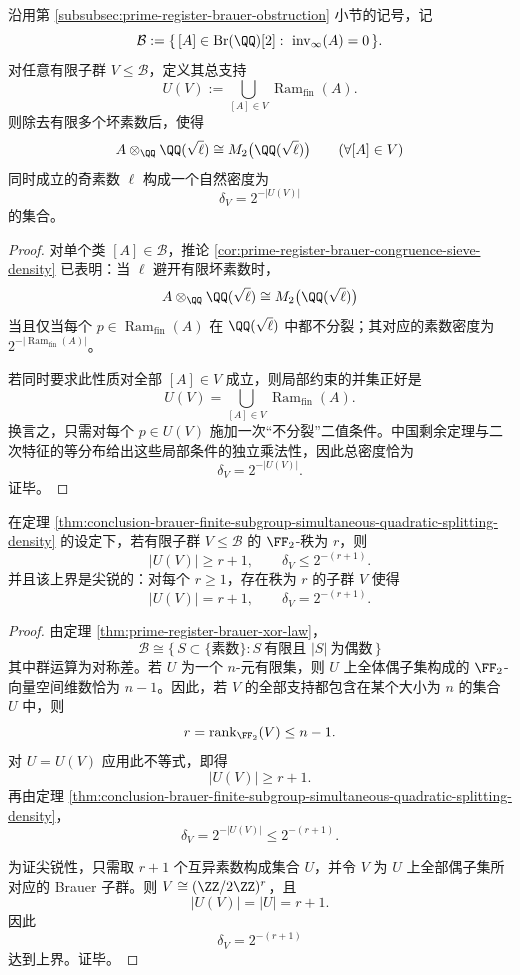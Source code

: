 \begin{theorem}\label{thm:conclusion-brauer-finite-subgroup-simultaneous-quadratic-splitting-density}
沿用第 \ref{subsubsec:prime-register-brauer-obstruction} 小节的记号，记
\[
\mathcal B:=\{\, [A]\in \mathrm{Br}(\QQ)[2]:\ \operatorname{inv}_\infty(A)=0\,\}.
\]
对任意有限子群 \(V\le \mathcal B\)，定义其总支持
\[
U(V):=\bigcup_{[A]\in V}\operatorname{Ram}_{\mathrm{fin}}(A).
\]
则除去有限多个坏素数后，使得
\[
A\otimes_{\QQ}\QQ(\sqrt{\ell})\cong M_2\bigl(\QQ(\sqrt{\ell})\bigr)
\qquad(\forall [A]\in V)
\]
同时成立的奇素数 \(\ell\) 构成一个自然密度为
\[
\delta_V=2^{-|U(V)|}
\]
的集合。
\end{theorem}
\begin{proof}
对单个类 \([A]\in\mathcal B\)，推论 \ref{cor:prime-register-brauer-congruence-sieve-density} 已表明：当 \(\ell\) 避开有限坏素数时，
\[
A\otimes_{\QQ}\QQ(\sqrt{\ell})\cong M_2\bigl(\QQ(\sqrt{\ell})\bigr)
\]
当且仅当每个 \(p\in \operatorname{Ram}_{\mathrm{fin}}(A)\) 在 \(\QQ(\sqrt{\ell})\) 中都不分裂；其对应的素数密度为 \(2^{-|\operatorname{Ram}_{\mathrm{fin}}(A)|}\)。

若同时要求此性质对全部 \([A]\in V\) 成立，则局部约束的并集正好是
\[
U(V)=\bigcup_{[A]\in V}\operatorname{Ram}_{\mathrm{fin}}(A).
\]
换言之，只需对每个 \(p\in U(V)\) 施加一次“不分裂”二值条件。中国剩余定理与二次特征的等分布给出这些局部条件的独立乘法性，因此总密度恰为
\[
\delta_V=2^{-|U(V)|}.
\]
证毕。
\end{proof}

\begin{theorem}\label{thm:conclusion-brauer-rank-support-sharp-density-bound}
在定理 \ref{thm:conclusion-brauer-finite-subgroup-simultaneous-quadratic-splitting-density} 的设定下，若有限子群 \(V\le \mathcal B\) 的 \(\FF_2\)-秩为 \(r\)，则
\[
|U(V)|\ge r+1,
\qquad
\delta_V\le 2^{-(r+1)}.
\]
并且该上界是尖锐的：对每个 \(r\ge 1\)，存在秩为 \(r\) 的子群 \(V\) 使得
\[
|U(V)|=r+1,
\qquad
\delta_V=2^{-(r+1)}.
\]
\end{theorem}
\begin{proof}
由定理 \ref{thm:prime-register-brauer-xor-law}，
\[
\mathcal B
\cong
\{\,S\subset \{\text{素数}\}: S\ \text{有限且 }|S|\ \text{为偶数}\,\}
\]
其中群运算为对称差。若 \(U\) 为一个 \(n\)-元有限集，则 \(U\) 上全体偶子集构成的 \(\FF_2\)-向量空间维数恰为 \(n-1\)。因此，若 \(V\) 的全部支持都包含在某个大小为 \(n\) 的集合 \(U\) 中，则
\[
r=\operatorname{rank}_{\FF_2}(V)\le n-1.
\]
对 \(U=U(V)\) 应用此不等式，即得
\[
|U(V)|\ge r+1.
\]
再由定理 \ref{thm:conclusion-brauer-finite-subgroup-simultaneous-quadratic-splitting-density}，
\[
\delta_V=2^{-|U(V)|}\le 2^{-(r+1)}.
\]

为证尖锐性，只需取 \(r+1\) 个互异素数构成集合 \(U\)，并令 \(V\) 为 \(U\) 上全部偶子集所对应的 Brauer 子群。则 \(V\cong (\ZZ/2\ZZ)^r\)，且
\[
|U(V)|=|U|=r+1.
\]
因此
\[
\delta_V=2^{-(r+1)}
\]
达到上界。证毕。
\end{proof}

\endinput
